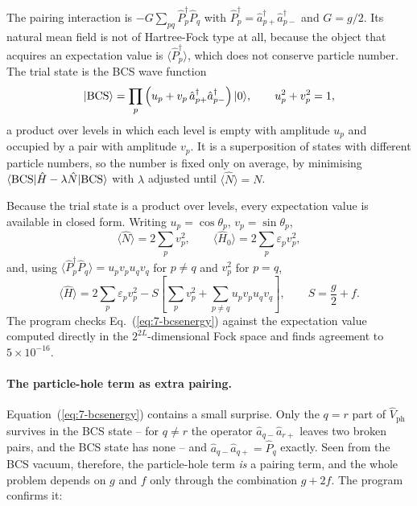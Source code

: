 The pairing interaction is
$-G\sum_{pq}\hat{P}^{\dagger}_{p}\hat{P}_{q}$ with
$\hat{P}^{\dagger}_{p}=\hat{a}^{\dagger}_{p+}\hat{a}^{\dagger}_{p-}$ and
$G=g/2$.  Its natural mean field is not of Hartree-Fock type at all, because
the object that acquires an expectation value is
$\langle\hat{P}^{\dagger}_{p}\rangle$, which does not conserve particle
number.  The trial state is the BCS wave function
\begin{equation}
  \vert \mathrm{BCS} \rangle = \prod_{p}\left(u_p + v_p\,
    \hat{a}^{\dagger}_{p+}\hat{a}^{\dagger}_{p-}\right)\vert 0 \rangle,
  \qquad u_p^2+v_p^2 = 1,
  \label{eq:7-bcs}
\end{equation}
a product over levels in which each level is empty with amplitude $u_p$ and
occupied by a pair with amplitude $v_p$.  It is a superposition of states with
different particle numbers, so the number is fixed only on average, by
minimising $\langle \mathrm{BCS} | \hat{H}-\lambda\hat{N} | \mathrm{BCS} \rangle$ with
$\lambda$ adjusted until $\langle\hat{N}\rangle=N$.

Because the trial state is a product over levels, every expectation value is
available in closed form.  Writing $u_p=\cos\theta_p$, $v_p=\sin\theta_p$,
\begin{equation}
  \langle\hat{N}\rangle = 2\sum_p v_p^2,
  \qquad
  \langle\hat{H}_0\rangle = 2\sum_p \varepsilon_p v_p^2,
  \label{eq:7-bcsN}
\end{equation}
and, using $\langle\hat{P}^{\dagger}_p\hat{P}_q\rangle = u_pv_pu_qv_q$ for
$p\ne q$ and $v_p^2$ for $p=q$,
\begin{equation}
  \langle\hat{H}\rangle
   = 2\sum_p\varepsilon_p v_p^2
   - S\left[\sum_p v_p^2
     + \sum_{p\ne q}u_pv_pu_qv_q\right],
  \qquad
  S = \frac{g}{2} + f .
  \label{eq:7-bcsenergy}
\end{equation}
The program checks Eq.~(\ref{eq:7-bcsenergy}) against the expectation value
computed directly in the $2^{2L}$-dimensional Fock space and finds agreement
to $5\times10^{-16}$.

\paragraph{The particle-hole term as extra pairing.}
Equation~(\ref{eq:7-bcsenergy}) contains a small surprise.  Only the $q=r$
part of $\hat{V}_{\mathrm{ph}}$ survives in the BCS state -- for $q\ne r$ the
operator $\hat{a}_{q-}\hat{a}_{r+}$ leaves two broken pairs, and the BCS state
has none -- and $\hat{a}_{q-}\hat{a}_{q+}=\hat{P}_q$ exactly.  Seen from the
BCS vacuum, therefore, the particle-hole term \emph{is} a pairing term, and
the whole problem depends on $g$ and $f$ only through the combination
$g+2f$.  The program confirms it:

